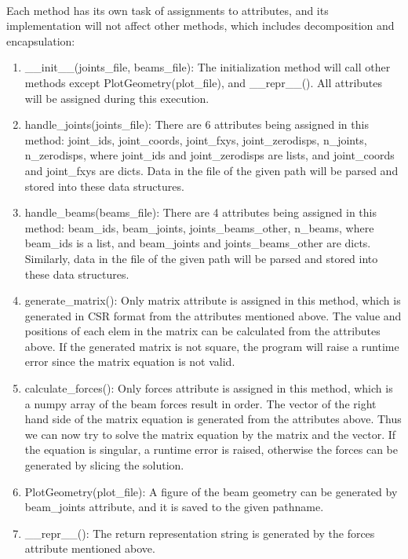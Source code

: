 \documentclass[12pt,letterpaper]{article}
\begin{document}
\paragraph{} Each method has its own task of assignments to attributes, and its implementation will not affect other methods, which includes decomposition and encapsulation:
\begin{enumerate}
\item \_\_init\_\_(joints\_file, beams\_file): The initialization method will call other methods except PlotGeometry(plot\_file), and \_\_repr\_\_(). All attributes will be assigned during this execution.
\item handle\_joints(joints\_file): There are 6 attributes being assigned in this method: joint\_ids, joint\_coords, joint\_fxys, joint\_zerodisps, n\_joints, n\_zerodisps, where joint\_ids and joint\_zerodisps are lists, and joint\_coords and joint\_fxys are dicts. Data in the file of the given path will be parsed and stored into these data structures.
\item handle\_beams(beams\_file): There are 4 attributes being assigned in this method: beam\_ids, beam\_joints, joints\_beams\_other, n\_beams, where beam\_ids is a list, and beam\_joints and joints\_beams\_other are dicts. Similarly, data in the file of the given path will be parsed and stored into these data structures.
\item generate\_matrix(): Only matrix attribute is assigned in this method, which is generated in CSR format from the attributes mentioned above. The value and positions of each elem in the matrix can be calculated from the attributes above. If the generated matrix is not square, the program will raise a runtime error since the matrix equation is not valid.
\item calculate\_forces(): Only forces attribute is assigned in this method, which is a numpy array of the beam forces result in order. The vector of the right hand side of the matrix equation is generated from the attributes above. Thus we can now try to solve the matrix equation by the matrix and the vector. If the equation is singular, a runtime error is raised, otherwise the forces can be generated by slicing the solution.
\item PlotGeometry(plot\_file): A figure of the beam geometry can be generated by beam\_joints attribute, and it is saved to the given pathname.
\item \_\_repr\_\_(): The return representation string is generated by the forces attribute mentioned above.
\end{enumerate}
\end{document}
